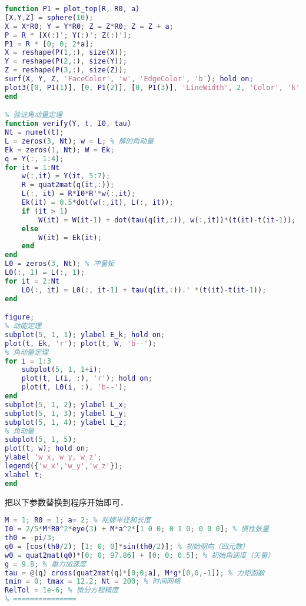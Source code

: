 \begin{lstlisting}[language=matlab, caption=top_sim.m]
% 画陀螺
function P1 = plot_top(R, R0, a)
[X,Y,Z] = sphere(10);
X = X*R0; Y = Y*R0; Z = Z*R0; Z = Z + a;
P = R * [X(:)'; Y(:)'; Z(:)'];
P1 = R * [0; 0; 2*a];
X = reshape(P(1,:), size(X));
Y = reshape(P(2,:), size(Y));
Z = reshape(P(3,:), size(Z));
surf(X, Y, Z, 'FaceColor', 'w', 'EdgeColor', 'b'); hold on;
plot3([0, P1(1)], [0, P1(2)], [0, P1(3)], 'LineWidth', 2, 'Color', 'k');
end

% 验证角动量定理
function verify(Y, t, I0, tau)
Nt = numel(t);
L = zeros(3, Nt); w = L; % 解的角动量
Ek = zeros(1, Nt); W = Ek;
q = Y(:, 1:4);
for it = 1:Nt
    w(:,it) = Y(it, 5:7);
    R = quat2mat(q(it,:));
    L(:, it) = R*I0*R'*w(:,it);
    Ek(it) = 0.5*dot(w(:,it), L(:, it));
    if (it > 1)
        W(it) = W(it-1) + dot(tau(q(it,:)), w(:,it))*(t(it)-t(it-1));
    else
        W(it) = Ek(it);
    end
end
L0 = zeros(3, Nt); % 冲量矩
L0(:, 1) = L(:, 1);
for it = 2:Nt
    L0(:, it) = L0(:, it-1) + tau(q(it,:)).' *(t(it)-t(it-1));
end

figure;
% 动能定理
subplot(5, 1, 1); ylabel E_k; hold on;
plot(t, Ek, 'r'); plot(t, W, 'b--');
% 角动量定理
for i = 1:3
    subplot(5, 1, 1+i);
    plot(t, L(i, :), 'r'); hold on;
    plot(t, L0(i, :), 'b--');
end
subplot(5, 1, 2); ylabel L_x;
subplot(5, 1, 3); ylabel L_y;
subplot(5, 1, 4); ylabel L_z;
% 角动量
subplot(5, 1, 5);
plot(t, w); hold on;
ylabel 'w_x, w_y, w_z';
legend({'w_x','w_y','w_z'});
xlabel t;
end
\end{lstlisting}

把以下参数替换到程序开始即可．
\begin{lstlisting}[language=matlab]
% === 参数设置 ===
M = 1; R0 = 1; a= 2; % 陀螺半径和长度
I0 = 2/5*M*R0^2*eye(3) + M*a^2*[1 0 0; 0 1 0; 0 0 0]; % 惯性张量
th0 = -pi/3;
q0 = [cos(th0/2); [1; 0; 0]*sin(th0/2)]; % 初始朝向（四元数）
w0 = quat2mat(q0)*[0; 0; 97.86] + [0; 0; 0.5]; % 初始角速度（矢量）
g = 9.8; % 重力加速度
tau = @(q) cross(quat2mat(q)*[0;0;a], M*g*[0,0,-1]); % 力矩函数
tmin = 0; tmax = 12.2; Nt = 200; % 时间网格
RelTol = 1e-6; % 微分方程精度
% ===============
\end{lstlisting}
